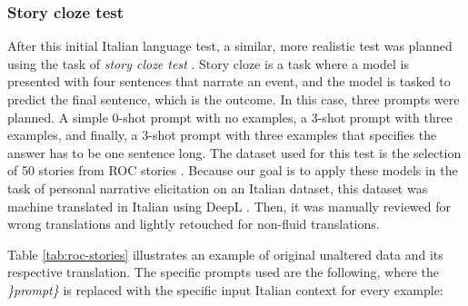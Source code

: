 \subsubsection{Story cloze test}
After this initial Italian language test, a similar, more realistic test was planned using the task of \emph{story cloze test} \cite{mostafazadeh2016corpus}. Story cloze is a task where a model is presented with four sentences that narrate an event, and the model is tasked to predict the final sentence, which is the outcome. In this case, three prompts were planned. A simple 0-shot prompt with no examples, a 3-shot prompt with three examples, and finally, a 3-shot prompt with three examples that specifies the answer has to be one sentence long. The dataset used for this test is the selection of 50 stories from ROC stories \cite{mostafazadeh2016corpus}. Because our goal is to apply these models in the task of personal narrative elicitation on an Italian dataset, this dataset was machine translated in Italian using DeepL \cite{deepl}. Then, it was manually reviewed for wrong translations and lightly retouched for non-fluid translations. 

Table \ref{tab:roc-stories} illustrates an example of original unaltered data and its respective translation.
The specific prompts used are the following, where the \emph{\}prompt\}} is replaced with the specific input Italian context for every example:
